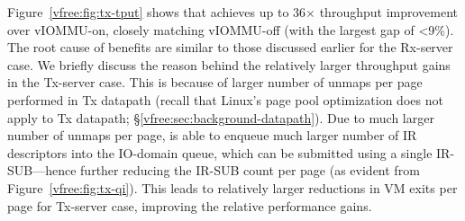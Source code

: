 Figure~\ref{vfree:fig:tx-tput} shows that {\vfreename} achieves up to 36$\times$ throughput improvement over vIOMMU-on,
closely matching vIOMMU-off (with the largest gap of <9\%). The root cause of {\vfreename} benefits are similar to those discussed earlier for the Rx-server case. We briefly discuss the reason behind the relatively larger throughput gains in the Tx-server case. This is because of larger number of unmaps per page performed in Tx datapath (recall that Linux's page pool optimization does not apply to Tx datapath; \S\ref{vfree:sec:background-datapath}). Due to much larger number of unmaps per page, {\vfreename} is able to enqueue much larger number of IR descriptors into the IO-domain queue, which can be submitted using a single IR-SUB---hence further reducing the IR-SUB count per page (as evident from Figure~\ref{vfree:fig:tx-qi}). This leads to relatively larger reductions in VM exits per page for Tx-server case, improving the relative performance gains.










